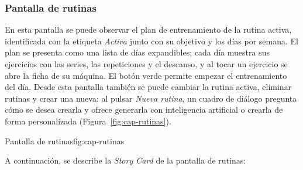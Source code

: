 \subsubsection{Pantalla de rutinas}

En esta pantalla se puede observar el plan de entrenamiento de la rutina
activa, identificada con la etiqueta \emph{Activa} junto con su objetivo y los
días por semana. El plan se presenta como una lista de días expandibles; cada
día muestra sus ejercicios con las series, las repeticiones y el descanso, y
al tocar un ejercicio se abre la ficha de su máquina. El botón verde permite
empezar el entrenamiento del día. Desde esta pantalla también se puede cambiar
la rutina activa, eliminar rutinas y crear una nueva: al pulsar
\emph{Nueva rutina}, un cuadro de diálogo pregunta cómo se desea crearla y
ofrece generarla con inteligencia artificial o crearla de forma personalizada
(Figura~\ref{fig:cap-rutinas}).

  {Pantalla de rutinas}{fig:cap-rutinas}

A continuación, se describe la \emph{Story Card} de la pantalla de rutinas:

